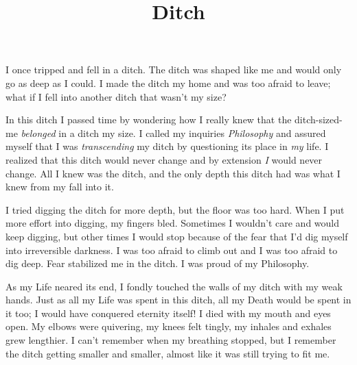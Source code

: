 \documentclass{article}
\title{Ditch}
\begin{document}
 \newline

I once tripped and fell in a ditch. The ditch was shaped like me and
would only go as deep as I could. I made the ditch my home and was too
afraid to leave; what if I fell into another ditch that wasn't my size?
\newline
\newline


In this ditch I passed time by wondering how I really knew that the
ditch-sized-me \textit{belonged} in a ditch my size. I called my
inquiries \textit{Philosophy} and assured myself that I was
\textit{transcending} my ditch by questioning its place in \textit{my}
life. I realized that this ditch would never change and by extension
\textit{I} would never change. All I knew was the ditch, and the only
depth this ditch had was what I knew from my fall into it. 
\newline
\newline


I tried digging the ditch for more depth, but the floor was too hard.
When I put more effort into digging, my fingers bled. Sometimes
I wouldn't care and would keep digging, but other times I would stop
because of the fear that I'd dig myself into irreversible darkness.
I was too afraid to climb out and I was too afraid to dig deep. Fear
stabilized me in the ditch. I was proud of my Philosophy. \newline
\newline


As my Life neared its end, I fondly touched the walls of my ditch with
my weak hands. Just as all my Life was spent in this ditch, all my Death
would be spent in it too; I would have conquered eternity itself! I died
with my mouth and eyes open. My elbows were quivering, my knees felt
tingly, my inhales and exhales grew lengthier. I can't remember when my
breathing stopped, but I remember the ditch getting smaller and smaller,
almost like it was still trying to fit me. \newline
\end{document}
